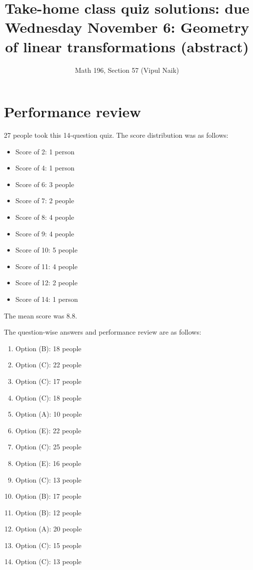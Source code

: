 \documentclass[10pt]{amsart}
\title{Take-home class quiz solutions: due Wednesday November 6: Geometry of linear transformations (abstract)}
\author{Math 196, Section 57 (Vipul Naik)}
\begin{document}
\maketitle

\section{Performance review}

27 people took this 14-question quiz. The score distribution was
as follows:

\begin {itemize}
\item Score of 2: 1 person
\item Score of 4: 1 person
\item Score of 6: 3 people
\item Score of 7: 2 people
\item Score of 8: 4 people
\item Score of 9: 4 people
\item Score of 10: 5 people
\item Score of 11: 4 people
\item Score of 12: 2 people
\item Score of 14: 1 person
\end{itemize}

The mean score was 8.8.

The question-wise answers and performance review are as follows:

\begin{enumerate}
\item Option (B): 18 people
\item Option (C): 22 people
\item Option (C): 17 people
\item Option (C): 18 people
\item Option (A): 10 people
\item Option (E): 22 people
\item Option (C): 25 people
\item Option (E): 16 people
\item Option (C): 13 people
\item Option (B): 17 people
\item Option (B): 12 people
\item Option (A): 20 people
\item Option (C): 15 people
\item Option (C): 13 people
\end{enumerate}
\end{document}
